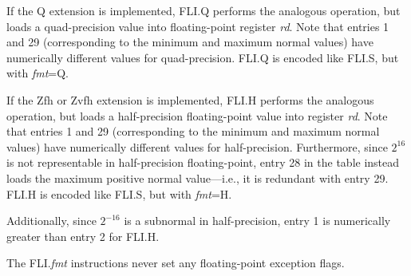 If the Q extension is implemented, FLI.Q performs the analogous operation,
but loads a quad-precision value into floating-point register {\em rd}.
Note that entries 1 and 29 (corresponding to the minimum and maximum
normal values) have numerically different values for quad-precision.
FLI.Q is encoded like FLI.S, but with {\em fmt}=Q.

If the Zfh or Zvfh extension is implemented, FLI.H performs the analogous
operation, but loads a half-precision floating-point value into register
{\em rd}.
Note that entries 1 and 29 (corresponding to the minimum and maximum normal
values) have numerically different values for half-precision.  Furthermore,
since $2^{16}$ is not representable in half-precision floating-point, entry 28
in the table instead loads the maximum positive normal value---i.e., it is
redundant with entry 29.  FLI.H is encoded like FLI.S, but with {\em fmt}=H.

\begin{commentary}
Additionally, since $2^{-16}$ is a subnormal in half-precision, entry 1 is numerically
greater than entry 2 for FLI.H.
\end{commentary}

The FLI.{\em fmt} instructions never set any floating-point exception flags.
